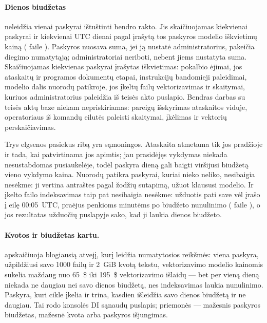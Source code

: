 \paragraph{Dienos biudžetas} neleidžia vienai paskyrai ištuštinti bendro rakto. Jis skaičiuojamas
kiekvienai paskyrai ir kiekvienai UTC dienai pagal įrašytą tos paskyros modelio iškvietimų kainą
( faile ). Paskyros nuosava suma, jei ją nustatė
administratorius, pakeičia diegimo numatytąją; administratoriai neriboti, nebent jiems nustatyta
suma. Skaičiuojamas kiekvienas paskyrai įrašytas iškvietimas: pokalbio ėjimai, jos ataskaitų ir
programos dokumentų etapai, instrukcijų bandomieji paleidimai, modelio dalis nuorodų patikroje,
jos įkeltų failų vektorizavimas ir skaitymai, kuriuos administratorius paleidžia iš teisės akto
puslapio. Bendras darbas su teisės aktų baze niekam nepriskiriamas: pareigų išskyrimas ataskaitos
viduje, operatoriaus iš komandų eilutės paleisti skaitymai, įkėlimas ir vektorių perskaičiavimas.

Trys elgsenos pasiekus ribą yra sąmoningos. Ataskaita atmetama tik jos pradžioje ir tada, kai
patvirtinama jos apimtis; jau prasidėjęs vykdymas niekada nesustabdomas pusiaukelėje, todėl
paskyra dieną gali baigti viršijusi biudžetą vieno vykdymo kaina. Nuorodų patikra paskyrai, kuriai
nieko neliko, nesibaigia nesėkme: ji vertina antraštes pagal žodžių sutapimą, užuot klaususi modelio.
Ir įkelto failo indeksavimas taip pat nesibaigia nesėkme: užduotis  pati save vėl
įrašo į eilę 00:05~UTC, praėjus penkioms minutėms po biudžeto nunulinimo ( faile
), o jos rezultatas užduočių puslapyje sako, kad ji laukia dienos
biudžeto.

\paragraph{Kvotos ir biudžetas kartu.}  apskaičiuoja blogiausią
atvejį, kurį leidžia numatytosios reikšmės: viena paskyra, užpildžiusi savo 1000 failų ir 2~GiB
kvotą tekstu, vektorizavimo modelio kainomis sukelia maždaug nuo 65~\$ iki 195~\$ vektorizavimo
išlaidų --- bet per vieną dieną niekada ne daugiau nei savo dienos biudžetą, nes indeksavimas
laukia nunulinimo. Paskyra, kuri cikle įkelia ir trina, kasdien išleidžia savo dienos biudžetą ir
ne daugiau. Tai rodo konsolės DI sąnaudų puslapis; priemonės --- mažesnis paskyros biudžetas,
mažesnė kvota arba paskyros išjungimas.

